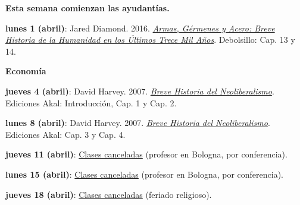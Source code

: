 \documentclass[letterpaper]{article}
\renewenvironment{itemize}{
  \begin{list}{}{
    \setlength{\leftmargin}{1.5em}
  }
}{
  \end{list}
}
\begin{document}
\begin{enumerate}
\begin{itemize}
		\vspace{0.2cm}
    
    \item[\Pointinghand] {\bf{\color{blue}Esta semana comienzan las ayudant\'ias.}}
		
    \item {\bf lunes 1 (abril)}: Jared Diamond. 2016. \href{https://github.com/hbahamonde/Intro_Ciencias_Sociales/raw/master/Readings/Armas_germenes_acero_Diamond.pdf}{\emph{Armas, G\'ermenes y Acero: Breve Historia de la Humanidad en los \'Ultimos Trece Mil A\~nos}}. Debolsillo: Cap. 13 y 14.

		\end{itemize}

\item {\bf Econom\'ia}

	\begin{itemize}
		
		\item {\bf jueves 4 (abril)}: David Harvey. 2007. \href{https://github.com/hbahamonde/Intro_Ciencias_Sociales/raw/master/Readings/Breve_histora_Neoliberalismo_Harvey.pdf}{\emph{Breve Historia del Neoliberalismo}}. Ediciones Akal: Introducci\'on, Cap. 1 y Cap. 2. 

		\vspace{0.2cm}

		\item {\bf lunes 8 (abril)}: David Harvey. 2007. \href{https://github.com/hbahamonde/Intro_Ciencias_Sociales/raw/master/Readings/Breve_histora_Neoliberalismo_Harvey.pdf}{\emph{Breve Historia del Neoliberalismo}}. Ediciones Akal: Cap. 3 y Cap. 4. 

		\vspace{0.2cm}

		\item[] {\bf jueves 11 (abril)}: {\underline{Clases canceladas} (profesor en Bologna, por conferencia).}

		\vspace{0.2cm}

		\item[] {\bf lunes 15 (abril)}: {\underline{Clases canceladas} (profesor en Bologna, por conferencia).}

		\vspace{0.2cm}

		\item[] {\bf jueves 18 (abril)}: {\underline{Clases canceladas} (feriado religioso).}


\end{itemize}
\end{enumerate}
\end{document}
